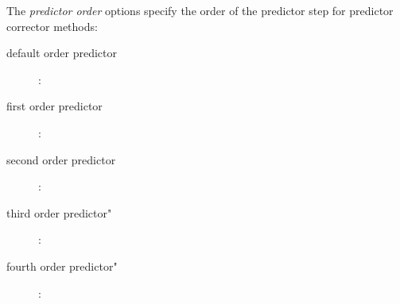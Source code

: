 \documentclass{article}
\begin{document}
\noindent The {\em predictor order} options specify the order of the predictor step
for predictor corrector methods: 
\begin{description}
  \item[\qquad default order predictor] :
  \item[\qquad first order predictor] :
  \item[\qquad second order predictor] :
  \item[\qquad third order predictor"] :
  \item[\qquad fourth order predictor"] :
\end{description}

























\end{document}
